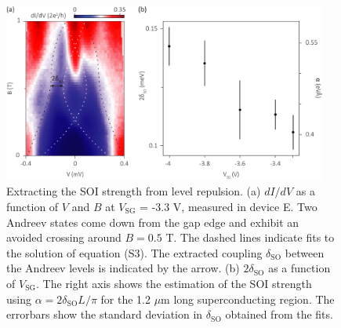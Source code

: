 \begin{figure}[h]
\includegraphics[width=0.95\textwidth]{figures/SFig3_Anticrossing.pdf}
\caption{\label{fig:SOIlevelrep}
Extracting the SOI strength from level repulsion.
(a) $dI/dV$ as a function of $V$ and $B$ at $V_{\mathrm{SG}}$ = -3.3 V, measured in device E.
Two Andreev states come down from the gap edge and exhibit an avoided crossing around $B = 0.5$ T.
The dashed lines indicate fits to the solution of equation (S3).
The extracted coupling $\delta_{\mathrm{SO}}$ between the Andreev levels is indicated by the arrow.
(b) $2\delta_{\mathrm{SO}}$ as a function of $V_{\mathrm{SG}}$.
The right axis shows the estimation of the SOI strength using $\alpha = 2\delta_{\mathrm{SO}}L/\pi$ for the 1.2 $\mu$m long superconducting region.
The errorbars show the standard deviation in $\delta_{\mathrm{SO}}$ obtained from the fits.
}
\end{figure}

\clearpage
